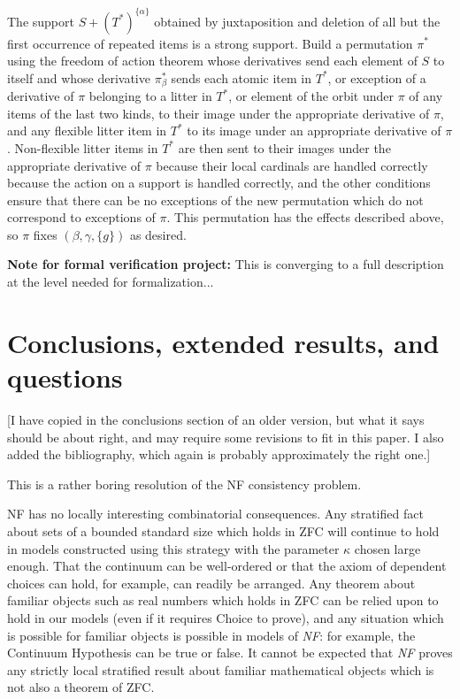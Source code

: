 \documentclass[112pt]{article}
\begin{document}
The support $S+(T^*)^{\{\alpha\}}$ obtained by juxtaposition and deletion of all but the first occurrence of repeated items is a strong support.  Build a permutation $\pi^*$ using the freedom of action theorem whose derivatives
send each element of $S$ to itself and whose derivative $\pi^*_\beta$ sends each atomic item in $T^*$, or exception of a derivative of $\pi$ belonging to a litter in $T^*$, or element of the orbit under $\pi$ of any items of the last two kinds, to their image under the appropriate derivative of $\pi$, and any flexible litter item in $T^*$ to its image under an appropriate derivative of $\pi$.  Non-flexible litter items in $T^*$ are then sent to their images under the appropriate derivative of $\pi$ because their local cardinals are handled correctly because the action on a support is handled correctly, and the other conditions ensure that there can be no exceptions of the new permutation which do not correspond to exceptions of $\pi$.  This permutation has the effects described above, so $\pi$ fixes $(\beta,\gamma,\{g\})$ as desired.



{\bf Note for formal verification project:}  This is converging to a full description at the level needed for formalization...

\newpage

\section{Conclusions, extended results, and questions}
[I have copied in the conclusions section of an older version, but what it says should be about right, 
and may require some revisions to fit in this paper.  I also added the bibliography, which again is probably approximately the right one.]

This is a rather boring resolution of the NF consistency problem.

NF has no locally interesting combinatorial consequences.   Any stratified fact about sets of a bounded standard size which holds in ZFC will continue to hold in models constructed using this strategy with the parameter $\kappa$ chosen large enough.
That the continuum can be well-ordered or that the axiom of dependent choices can hold, for example, can readily be arranged.  Any theorem about familiar objects such as real numbers which holds in ZFC can be relied upon to hold in our models
(even if it requires Choice to prove), and any situation which is possible for familiar objects is possible in models of {\em NF\/}:  for example, the Continuum Hypothesis can be true or false.  It cannot be expected that {\em NF\/} proves any strictly local stratified result about familiar mathematical objects which is not also a theorem of ZFC.
\end{document}
